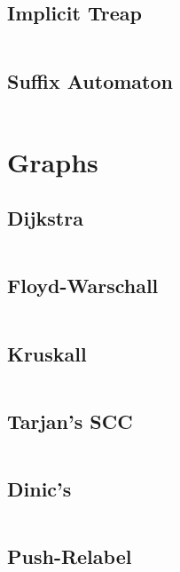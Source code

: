 \documentclass[11pt, a4paper]{amsart}
\begin{document}
	\newpage
	\begin{multicols*}{2}
		\subsection{Implicit Treap}
		\inputminted[firstline=16,lastline=57]{c++}{.code/datastructures/implicit_treap.cpp}
		\vfill\null
		\columnbreak
		\subsection{Suffix Automaton}
		\inputminted[firstline=16,lastline=43]{c++}{.code/strings/suffixAutomaton.cpp}
		\vfill\null
	\end{multicols*}
	\section{Graphs}
	\begin{multicols*}{2}
		\subsection{Dijkstra}
		\inputminted[firstline=21,lastline=28]{c++}{.code/graphs/dijkstra.cpp}
		\subsection{Floyd-Warschall}
		\inputminted[firstline=17,lastline=21]{c++}{.code/graphs/floyd_warschall.cpp}
		\subsection{Kruskall}
		\inputminted[firstline=27,lastline=36]{c++}{.code/graphs/kruskall.cpp}
		\subsection{Tarjan's SCC}
		\inputminted[firstline=27,lastline=39]{c++}{.code/graphs/scc.cpp}
		\vfill\null
		\columnbreak
		\subsection{Dinic's}
		\inputminted[firstline=11,lastline=29]{c++}{.code/graphs/dinic.cpp}
		\subsection{Push-Relabel}
		\inputminted[firstline=11,lastline=25]{c++}{.code/graphs/pushrelabel.cpp}
		\vfill\null
	\end{multicols*}
	\newpage
\end{document}
